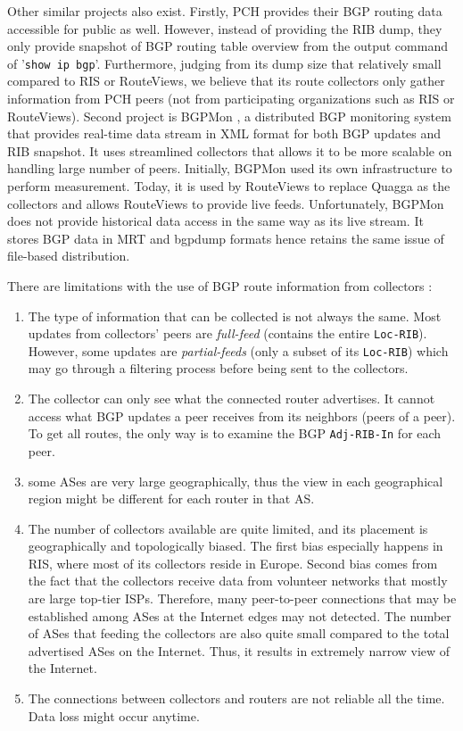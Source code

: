 Other similar projects also exist. Firstly, PCH \cite{pch} provides their BGP routing data accessible for public as well. However, instead of providing the RIB dump, they only provide snapshot of BGP routing table overview from the output command of '\texttt{show ip bgp}'. Furthermore, judging from its dump size that relatively small compared to RIS or RouteViews, we believe that its route collectors only gather information from PCH peers (not from participating organizations such as RIS or RouteViews). Second project is BGPMon \cite{bgpmon}, a distributed BGP monitoring system that provides real-time data stream in XML format for both BGP updates and RIB snapshot. It uses streamlined collectors that allows it to be more scalable on handling large number of peers. Initially, BGPMon used its own infrastructure to perform measurement. Today, it is used by RouteViews to replace Quagga as the collectors and allows RouteViews to provide live feeds. Unfortunately, BGPMon does not provide historical data access in the same way as its live stream. It stores BGP data in MRT and bgpdump formats hence retains the same issue of file-based distribution.

There are limitations with the use of BGP route information from collectors \cite{6027863,Gregori:2012:IAG:2398776.2398803}:
\begin{enumerate}
	\item The type of information that can be collected is not always the same. Most updates from collectors' peers are \textit{full-feed} (contains the entire \texttt{Loc-RIB}). However, some updates are \textit{partial-feeds} (only a subset of its \texttt{Loc-RIB}) which may go through a filtering process before being sent to the collectors.
	\item The collector can only see what the connected router advertises. It cannot access what BGP updates a peer receives from its neighbors (peers of a peer). To get all routes, the only way is to examine the BGP \texttt{Adj-RIB-In} for each peer.
	\item some ASes are very large geographically, thus the view in each geographical region might be different for each router in that AS.
	\item The number of collectors available are quite limited, and its placement is geographically and topologically biased. The first bias especially happens in RIS, where most of its collectors reside in Europe. Second bias comes from the fact that the collectors receive data from volunteer networks that mostly are large top-tier ISPs. Therefore, many peer-to-peer connections that may be established among ASes at the Internet edges may not detected. The number of ASes that feeding the collectors are also quite small compared to the total advertised ASes on the Internet. Thus, it results in extremely narrow view of the Internet.
	\item The connections between collectors and routers are not reliable all the time. Data loss might occur anytime.
\end{enumerate}


